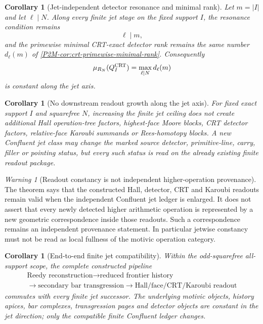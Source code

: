 \documentclass[11pt]{article}
\newtheorem{corollary}[theorem]{Corollary}
\theoremstyle{remark}
\newtheorem{warning}[theorem]{Warning}
\begin{document}
\begin{corollary}[Jet-independent detector resonance and minimal rank]
\label{P2M-cor:v37-jet-independent-resonance}
Let $m=|I|$ and let $\ell\mid N$.  Along every finite jet stage on the fixed
support $I$, the resonance condition remains
\[
 \ell\mid m,
\]
and the primewise minimal CRT-exact detector rank remains the same number
$d_\ell(m)$ of \cref{P2M-cor:crt-primewise-minimal-rank}.  Consequently
\[
 \mu_{R_N}(Q_I^{\rm CRT})
 =\max_{\ell\mid N}d_\ell(m)
\]
is constant along the jet axis.
\end{corollary}

\begin{corollary}[No downstream readout growth along the jet axis]
\label{P2M-cor:v37-no-readout-growth}
For fixed exact support $I$ and squarefree $N$, increasing the finite jet
ceiling does not create additional Hall operation-tree factors, highest-face
Moore blocks, CRT detector factors, relative-face Karoubi summands or
Rees-homotopy blocks.  A new Confluent jet class may change the marked source
detector, primitive-line, carry, filler or pointing status, but every such
status is read on the already existing finite readout package.
\end{corollary}

\begin{warning}[Readout constancy is not independent higher-operation provenance]
\label{P2M-warn:v37-readout-not-new-provenance}
The theorem says that the constructed Hall, detector, CRT and Karoubi
readouts remain valid when the independent Confluent jet ledger is enlarged.
It does not assert that every newly detected higher arithmetic operation is
represented by a new geometric correspondence inside those readouts.  Such a
correspondence remains an independent provenance statement.  In particular
jetwise constancy must not be read as local fullness of the motivic operation
category.
\end{warning}

\begin{corollary}[End-to-end finite jet compatibility]
\label{P2M-cor:v37-end-to-end-jet-compatibility}
Within the odd-squarefree all-support scope, the complete constructed pipeline
\[
 \boxed{
 \begin{gathered}
 \text{Reedy reconstruction}
 \longrightarrow
 \text{reduced frontier history}\\
 \longrightarrow
 \text{secondary bar transgression}
 \longrightarrow
 \text{Hall/face/CRT/Karoubi readout}
 \end{gathered}}
\]
commutes with every finite jet successor.  The underlying motivic objects,
history apices, bar complexes, transgression pages and detector objects are
constant in the jet direction; only the compatible finite Confluent ledger
changes.
\end{corollary}
\end{document}

